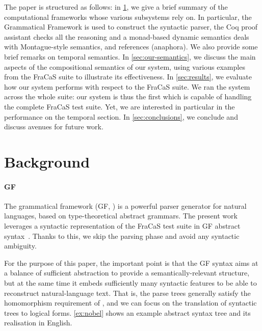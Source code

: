 \documentclass[a4paper,11pt]{article}
\begin{document}
The paper is structured as follows: in \cref{sec:background}, we give
a brief summary of the computational frameworks whose various
subsystems rely on. In particular, the Grammatical Framework is used
to construct the syntactic parser, the Coq proof assistant checks all
the reasoning and a monad-based dynamic semantics deals with
Montague-style semantics, and references (anaphora).  We also provide
some brief remarks on temporal semantics. In \cref{sec:our-semantics},
we discuss the main aspects of the compositional semantics of our
system, using various examples from the FraCaS suite to illustrate its
effectiveness. In \cref{sec:results}, we evaluate how our system
performs with respect to the FraCaS suite. We ran the system across
the whole suite: our system is thus the first which is capable of
handling the complete FraCaS test suite.  Yet, we are interested in
particular in the performance on the temporal section. In
\cref{sec:conclusions}, we conclude and discuss avenues for future
work.


\section{Background}
\label{sec:background}

\paragraph{GF}
The grammatical framework (GF, \citet{ranta_grammatical_2004}) is a powerful parser
generator for natural languages, based on type-theoretical abstract grammars.
The present work leverages a syntactic representation of the FraCaS test suite in GF
abstract syntax~\citep{Ljunglof:2012}. Thanks to this, we skip the parsing phase
and avoid any syntactic ambiguity.

For the purpose of this paper, the important point is that the GF
syntax aims at a balance of sufficient abstraction to provide a
semantically-relevant structure, but at the same time it embeds
sufficiently many syntactic features to be able to reconstruct
natural-language text. That is, the parse trees generally satisfy the
homomorphism requirement of \citet{Montague:EFL70,Montague1974}, and
we can focus on the translation of syntactic trees to logical forms.
\cref{ex:nobel} shows an example abstract syntax tree and its
realisation in English.
\end{document}
